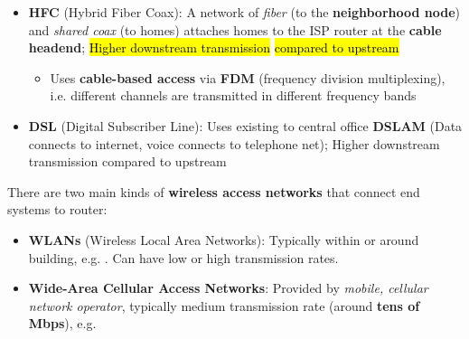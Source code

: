 \documentclass[12pt,a4paper]{article}
\begin{document}
\vspace{0.5em}\begin{itemize}
    \item \textbf{HFC} (Hybrid Fiber Coax): A network of \emph{fiber} (to the \textbf{neighborhood node}) and \emph {shared coax} (to homes) attaches homes to the ISP router at the \textbf{cable headend}; \hl{Higher downstream transmission} \hl{compared to upstream}
        \begin{itemize}
            \item Uses \textbf{cable-based access} via \textbf{FDM} (frequency division multiplexing), i.e. different channels are transmitted in different frequency bands
        \end{itemize}
    \item \textbf{DSL} (Digital Subscriber Line): Uses existing  to central office \textbf{DSLAM} (Data connects to internet, voice connects to telephone net); Higher downstream transmission compared to upstream
\end{itemize}

\noindent There are two main kinds of \textbf{wireless access networks} that connect end systems to router:
\begin{itemize}
    \item \textbf{WLANs} (Wireless Local Area Networks): Typically within or around building, e.g. . Can have low or high transmission rates.
    \item \textbf{Wide-Area Cellular Access Networks}: Provided by \emph{mobile, cellular network operator}, typically medium transmission rate (around \textbf{tens of Mbps}), e.g. 
\end{itemize}


\end{document}
